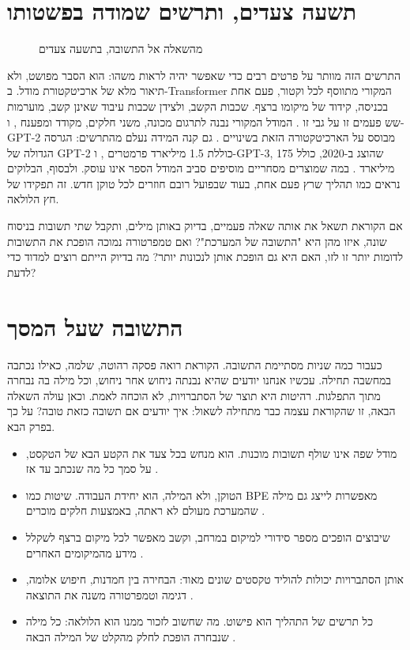 \section{תשעה צעדים, ותרשים שמודה בפשטותו}
\begin{figure}[htbp]
\centering

\caption{מהשאלה אל התשובה, בתשעה צעדים}\label{fig:4.2}
\end{figure}
התרשים הזה מוותר על פרטים רבים כדי שאפשר יהיה לראות משהו: הוא הסבר מפושט, ולא תיאור מלא של ארכיטקטורת מודל. ב-Transformer המקורי מתווסף לכל וקטור, פעם אחת בכניסה, קידוד של מיקומו ברצף. שכבות הקשב, ולצידן שכבות עיבוד שאינן קשב, מוערמות שש פעמים זו על גבי זו \cite{S-ch04-01}. המודל המקורי נבנה לתרגום מכונה, משני חלקים, מקודד ומפענח \cite{S-ch04-01}, ו-GPT-2 מבוסס על הארכיטקטורה הזאת בשינויים \cite{S-ch04-04}.
גם קנה המידה נעלם מהתרשים: הגרסה הגדולה של GPT-2 כוללת 1.5 מיליארד פרמטרים \cite{S-ch04-04}, ו-GPT-3, שהוצג ב-2020, כולל 175 מיליארד \cite{S-ch04-08}. במה שמוצרים מסחריים מוסיפים סביב המודל הספר אינו עוסק. ולבסוף, הבלוקים נראים כמו תהליך שרץ פעם אחת, בעוד שבפועל רובם חוזרים לכל טוקן חדש. זה תפקידו של חץ הלולאה.
\begin{thinkbox}
אם הקוראת תשאל את אותה שאלה פעמיים, בדיוק באותן מילים, ותקבל שתי תשובות בניסוח שונה, איזו מהן היא "התשובה של המערכת"? ואם טמפרטורה נמוכה הופכת את התשובות לדומות יותר זו לזו, האם היא גם הופכת אותן לנכונות יותר? מה בדיוק הייתם רוצים למדוד כדי לדעת?
\end{thinkbox}
\section{התשובה שעל המסך}
כעבור כמה שניות מסתיימת התשובה. הקוראת רואה פסקה רהוטה, שלמה, כאילו נכתבה במחשבה תחילה. עכשיו אנחנו יודעים שהיא נבנתה ניחוש אחר ניחוש, וכל מילה בה נבחרה מתוך התפלגות. רהיטות היא תוצר של הסתברויות, לא הוכחה לאמת.
וכאן עולה השאלה הבאה, זו שהקוראת עצמה כבר מתחילה לשאול: איך יודעים אם תשובה כזאת טובה? על כך בפרק הבא.
\begin{insightsbox}
\begin{itemize}
\item מודל שפה אינו שולף תשובות מוכנות. הוא מנחש בכל צעד את הקטע הבא של הטקסט, על סמך כל מה שנכתב עד אז \cite{S-ch04-03,S-ch04-04}.
\item הטוקן, ולא המילה, הוא יחידת העבודה. שיטות כמו BPE מאפשרות לייצג גם מילה שהמערכת מעולם לא ראתה, באמצעות חלקים מוכרים \cite{S-ch04-02,S-ch04-06}.
\item שיבוצים הופכים מספר סידורי למיקום במרחב, וקשב מאפשר לכל מיקום ברצף לשקלל מידע מהמיקומים האחרים \cite{S-ch04-01,S-ch04-05}.
\item אותן הסתברויות יכולות להוליד טקסטים שונים מאוד: הבחירה בין חמדנות, חיפוש אלומה, דגימה וטמפרטורה משנה את התוצאה \cite{S-ch04-03,S-ch04-07}.
\item כל תרשים של התהליך הוא פישוט. מה שחשוב לזכור ממנו הוא הלולאה: כל מילה שנבחרה הופכת לחלק מהקלט של המילה הבאה \cite{S-ch04-01}.
\end{itemize}
\end{insightsbox}
